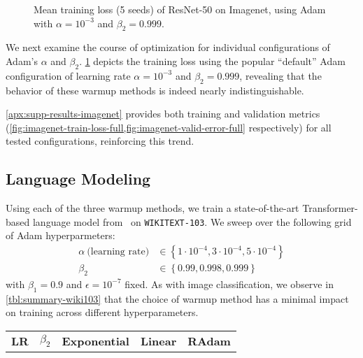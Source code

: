 {\begin{figure}[ht]
\caption{Mean training loss (5 seeds) of ResNet-50 on Imagenet, using Adam with $\alpha = 10^{-3}$ and $\beta_2 = 0.999$.}
  
\label{fig:imagenet-train-loss}\end{figure}

We next examine the course of optimization for individual configurations of Adam's $\alpha$ and $\beta_2$. \cref*{fig:imagenet-train-loss} depicts the training loss using the popular ``default'' Adam configuration of learning rate $\alpha = 10^{-3}$ and $\beta_2 = 0.999$, revealing that the behavior of these warmup methods is indeed nearly indistinguishable.

\cref*{apx:supp-results-imagenet} provides both training and validation metrics (\cref*{fig:imagenet-train-loss-full,fig:imagenet-valid-error-full} respectively) for all tested configurations, reinforcing this trend.

\subsection{Language Modeling}
\label{sec:results-wiki103}

Using each of the three warmup methods, we train a state-of-the-art Transformer-based language model from~\citet{baevski2018adaptivelm} on \texttt{WIKITEXT-103}. We sweep over the following grid of Adam hyperparmeters:
\begin{align*}
    \alpha~\text{(learning rate)} &\in \left\{ 1 \cdot {10}^{-4}, 3 \cdot {10}^{-4}, 5 \cdot {10}^{-4} \right\} \\
    \beta_2 &\in \left\{ 0.99, 0.998, 0.999 \right\}
\end{align*}
with $\beta_1=0.9$ and $\epsilon=10^{-7}$ fixed. As with image classification, we observe in \cref*{tbl:summary-wiki103} that the choice of warmup method has a minimal impact on training across different hyperparameters.

\begin{table}[ht]
\centering

\captionsetup{
  justification=centering,
  margin=0.25in
}

\scriptsize

\setlength{\tabcolsep}{3pt}

\begin{tabular}{l l | c c c}
  \toprule
  
  \textbf{LR} & \textbf{$\beta_2$} &          \textbf{Exponential} &               \textbf{Linear} &                \textbf{RAdam} \\
  

\end{tabular}
\end{table}}
